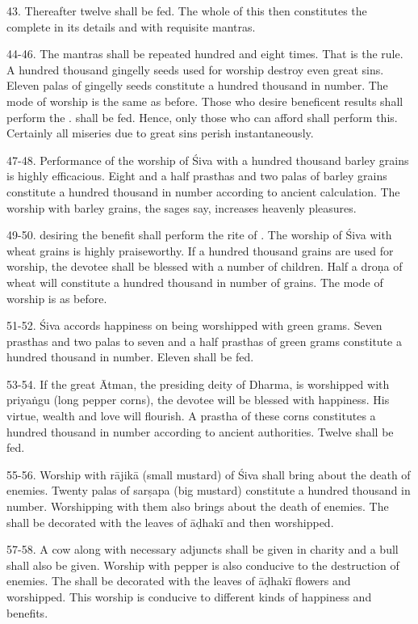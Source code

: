 43. Thereafter twelve  shall be fed. The whole of this then
constitutes the  complete in its details and with requisite
mantras.

44-46. The mantras shall be repeated hundred and eight times. That is the rule.
A hundred thousand gingelly seeds used for worship destroy even great sins.
Eleven palas of gingelly seeds constitute a hundred thousand in number. The mode
of worship is the same as before. Those who desire beneficent results shall
perform the .  shall be fed. Hence, only those who can
afford shall perform this. Certainly all miseries due to great sins perish
instantaneously.

47-48. Performance of the worship of Śiva with a hundred thousand barley grains
is highly efficacious. Eight and a half prasthas and two palas of barley grains
constitute a hundred thousand in number according to ancient calculation.
The worship with barley grains, the sages say, increases heavenly pleasures.

49-50.  desiring the benefit shall perform the rite of
. The worship of Śiva with wheat grains is highly praiseworthy.
If a hundred thousand grains are used for worship, the devotee shall be blessed
with a number of children. Half a droṇa of wheat will constitute a hundred
thousand in number of grains. The mode of worship is as before.

51-52. Śiva accords happiness on being worshipped with green grams. Seven
prasthas and two palas to seven and a half prasthas of green grams constitute
a hundred thousand in number. Eleven  shall be fed.

53-54. If the great Ātman, the presiding deity of Dharma, is worshipped with
priyaṅgu (long pepper corns), the devotee will be blessed with happiness. His
virtue, wealth and love will flourish. A prastha of these corns constitutes
a hundred thousand in number according to ancient authorities. Twelve
 shall be fed.

55-56. Worship with rājikā (small mustard) of Śiva shall bring about the death
of enemies. Twenty palas of sarṣapa (big mustard) constitute a hundred thousand
in number. Worshipping with them also brings about the death of enemies.
The  shall be decorated with the leaves of āḍhakī and then
worshipped.

57-58. A cow along with necessary adjuncts shall be given in charity and a bull
shall also be given. Worship with pepper is also conducive to the destruction of
enemies. The  shall be decorated with the leaves of āḍhakī flowers
and worshipped. This worship is conducive to different kinds of happiness and
benefits.

